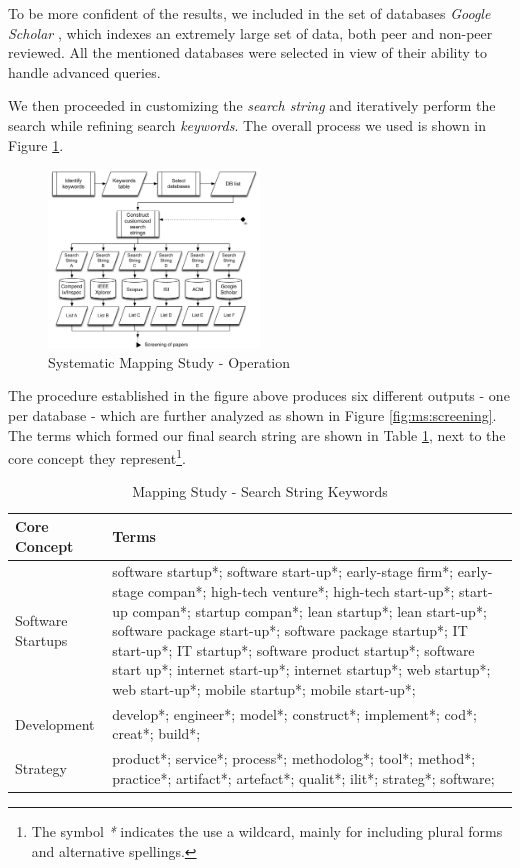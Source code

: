 \documentclass[final,5p,times,twocolumn]{elsarticle}
\begin{document}
To be more confident of the results, we included in the set of databases \textit{Google Scholar}  \cite{gScholar}, which indexes an extremely large set of data, both peer and non-peer reviewed. All the mentioned databases were selected in view of their ability to handle advanced queries.  

We then proceeded in customizing the \textit{search string} and iteratively perform the search while refining search \textit{keywords}. The overall process we used is shown in Figure \ref{fig:ms:conduct}.  

\begin{figure}[H]
\centering
\includegraphics[width=0.5\textwidth,keepaspectratio=true]{figures/conduct.png}
\caption{Systematic Mapping Study - Operation }
\label{fig:ms:conduct}
\end{figure}


The procedure established in the figure above produces six different outputs - one per database - which are further analyzed as shown in Figure \ref{fig:ms:screening}.
The terms which formed our final search string are shown in Table \ref{tab:ms:search-keywords}, next to the core concept they represent\footnote{The symbol \textit{*} indicates the use a wildcard, mainly for including plural forms and alternative spellings.}. 

\begin{table}[H]
\renewcommand{\arraystretch}{1.1}
\caption{Mapping Study - Search String Keywords}
\label{tab:ms:search-keywords}
\centering
\scriptsize \begin{tabular}{|p{0.75in}|p{1.7in}|}
\hline 
\hline
 Core Concept &	Terms \\
\hline
Software Startups & software startup*;  software start-up*; early-stage firm*; early-stage compan*; high-tech venture*; high-tech start-up*; start-up compan*; startup compan*; lean startup*; lean start-up*;  software package start-up*; software package startup*; IT start-up*; IT startup*; software product startup*; software start up*; internet start-up*; internet startup*; web startup*; web start-up*; mobile startup*; mobile start-up*;  \\ \hline 
Development & develop*; engineer*; model*; construct*; implement*; cod*; creat*; build*; \\ \hline 
Strategy & product*; service*; process*; methodolog*; tool*; method*; practice*; artifact*;  artefact*; qualit*; ilit*; strateg*; software; \\
\hline
\hline
 \end{tabular}
 \end{table}
\end{document}
